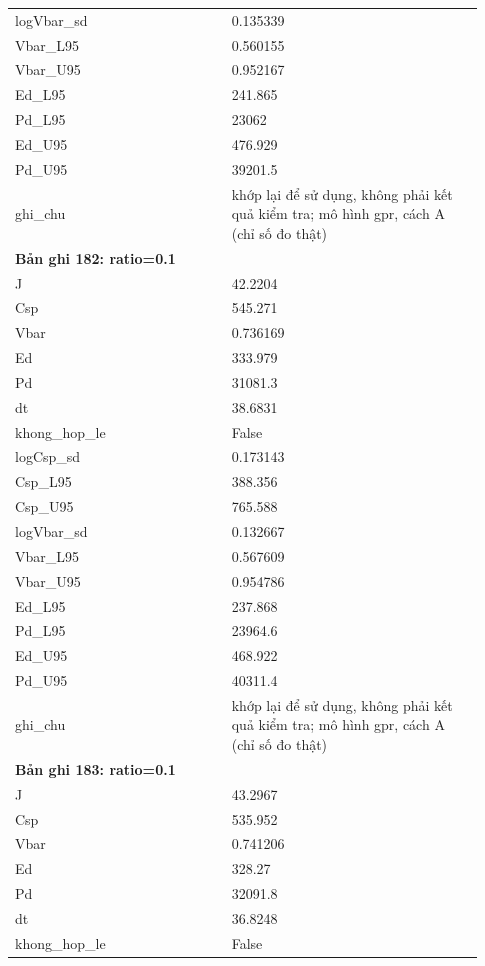 \begin{longtable}{p{0.43\linewidth}p{0.50\linewidth}}
logVbar\_\allowbreak sd & 0.135339 \\
Vbar\_\allowbreak L95 & 0.560155 \\
Vbar\_\allowbreak U95 & 0.952167 \\
Ed\_\allowbreak L95 & 241.865 \\
Pd\_\allowbreak L95 & 23062 \\
Ed\_\allowbreak U95 & 476.929 \\
Pd\_\allowbreak U95 & 39201.5 \\
ghi\_\allowbreak chu & khớp lại để sử dụng, không phải kết quả kiểm tra; mô hình gpr, cách A (chỉ số đo thật) \\
\midrule
\multicolumn{2}{p{0.95\linewidth}}{\textbf{Bản ghi 182: ratio=0.1}} \\
J & 42.2204 \\
Csp & 545.271 \\
Vbar & 0.736169 \\
Ed & 333.979 \\
Pd & 31081.3 \\
dt & 38.6831 \\
khong\_\allowbreak hop\_\allowbreak le & False \\
logCsp\_\allowbreak sd & 0.173143 \\
Csp\_\allowbreak L95 & 388.356 \\
Csp\_\allowbreak U95 & 765.588 \\
logVbar\_\allowbreak sd & 0.132667 \\
Vbar\_\allowbreak L95 & 0.567609 \\
Vbar\_\allowbreak U95 & 0.954786 \\
Ed\_\allowbreak L95 & 237.868 \\
Pd\_\allowbreak L95 & 23964.6 \\
Ed\_\allowbreak U95 & 468.922 \\
Pd\_\allowbreak U95 & 40311.4 \\
ghi\_\allowbreak chu & khớp lại để sử dụng, không phải kết quả kiểm tra; mô hình gpr, cách A (chỉ số đo thật) \\
\midrule
\multicolumn{2}{p{0.95\linewidth}}{\textbf{Bản ghi 183: ratio=0.1}} \\
J & 43.2967 \\
Csp & 535.952 \\
Vbar & 0.741206 \\
Ed & 328.27 \\
Pd & 32091.8 \\
dt & 36.8248 \\
khong\_\allowbreak hop\_\allowbreak le & False \\

\end{longtable}
